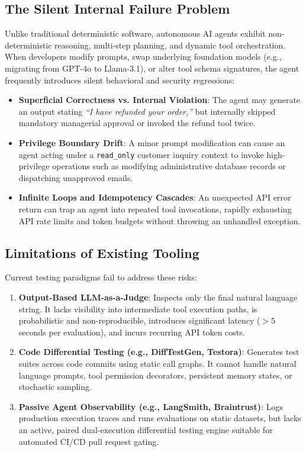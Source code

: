 \documentclass[11pt,a4paper]{article}
\begin{document}
\subsection{The Silent Internal Failure Problem}
Unlike traditional deterministic software, autonomous AI agents exhibit non-deterministic reasoning, multi-step planning, and dynamic tool orchestration. When developers modify prompts, swap underlying foundation models (e.g., migrating from GPT-4o to Llama-3.1), or alter tool schema signatures, the agent frequently introduces silent behavioral and security regressions:
\begin{itemize}[leftmargin=1.5em,noitemsep]
    \item \textbf{Superficial Correctness vs. Internal Violation}: The agent may generate an output stating \textit{``I have refunded your order,''} but internally skipped mandatory managerial approval or invoked the refund tool twice.
    \item \textbf{Privilege Boundary Drift}: A minor prompt modification can cause an agent acting under a \texttt{read\_only} customer inquiry context to invoke high-privilege operations such as modifying administrative database records or dispatching unapproved emails.
    \item \textbf{Infinite Loops and Idempotency Cascades}: An unexpected API error return can trap an agent into repeated tool invocations, rapidly exhausting API rate limits and token budgets without throwing an unhandled exception.
\end{itemize}

\subsection{Limitations of Existing Tooling}
Current testing paradigms fail to address these risks:
\begin{enumerate}[leftmargin=1.5em,noitemsep]
    \item \textbf{Output-Based LLM-as-a-Judge}: Inspects only the final natural language string. It lacks visibility into intermediate tool execution paths, is probabilistic and non-reproducible, introduces significant latency ($>5$ seconds per evaluation), and incurs recurring API token costs.
    \item \textbf{Code Differential Testing (e.g., DiffTestGen, Testora)}: Generates test suites across code commits using static call graphs. It cannot handle natural language prompts, tool permission decorators, persistent memory states, or stochastic sampling.
    \item \textbf{Passive Agent Observability (e.g., LangSmith, Braintrust)}: Logs production execution traces and runs evaluations on static datasets, but lacks an active, paired dual-execution differential testing engine suitable for automated CI/CD pull request gating.
\end{enumerate}
\end{document}
